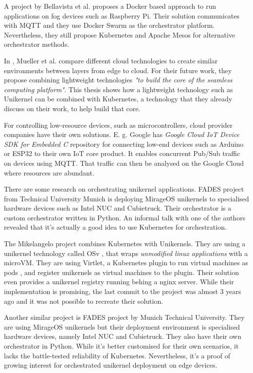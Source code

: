 A project by Bellavista et al. \cite{Bellavista2017} proposes a Docker based approach to run applications on fog devices such as Raspberry Pi. Their solution communicates with MQTT and they use Docker Swarm as the orchestrator platform. Nevertheless, they still propose Kubernetes and Apache Mesos for alternative orchestrator methods.

In \cite{Mueller2017} , Mueller et al. compare different cloud technologies to create similar environments between layers from edge to cloud. For their future work, they propose combining lightweight technologies \textit{"to build the core of the seamless computing platform"}. This thesis shows how a lightweight technology such as Unikernel can be combined with Kubernetes, a technology that they already discuss on their work, to help build that core.

For controlling low-resource devices, such as microcontrollers, cloud provider companies have their own solutions. E. g. Google has \textit{Google Cloud IoT Device SDK for Embedded C} repository for connecting low-end devices such as Arduino or ESP32 to their own IoT core product. It enables concurrent Pub/Sub traffic on devices using MQTT. That traffic can then be analysed on the Google Cloud where resources are abundant.

There are some research on orchestrating unikernel applications. FADES project \cite{fades} from Technical University Munich is deploying MirageOS unikernels to specialised hardware devices such as Intel NUC and Cubietruck. Their orchestrator is a custom orchestrator written in Python. An informal talk with one of the authors revealed that it's actually a good idea to use Kubernetes for orchestration.

The Mikelangelo project \cite{Struckmann2018} combines Kubernetes with Unikernels. They are using a unikernel technology called OSv \cite{osv}, that wraps \textit{unmodified linux applications} with a microVM. They are using Virtlet, a Kubernetes plugin to run virtual machines as pods , and register unikernels as virtual machines to the plugin. Their solution even provides a unikernel registry running behing a nginx server. While their implementation is promising, the last commit to the project was almost 3 years ago and it was not possible to recreate their solution.



\iffalse

Another similar project is FADES \cite{fades} project by Munich Technical University. They are using MirageOS unikernels but their deployment environment is specialised hardware devices, namely Intel NUC and Cubietruck. They also have their own orchestrator in Python. While it's better customised for their own scenarios, it lacks the battle-tested reliability of Kubernetes. Nevertheless, it's a proof of growing interest for orchestrated unikernel deployment on edge devices.


